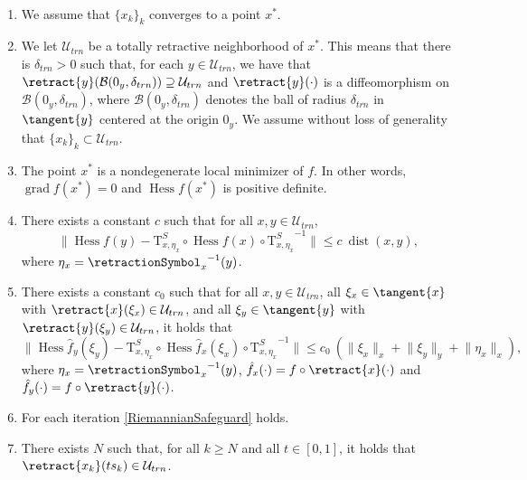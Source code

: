 \begin{assumption}\label{RiemannianAssumptionsLocalConvergence} \ \\[-1.5\baselineskip]
    \begin{enumerate}
        \item We assume that $\{ x_k \}_k$ converges to a point $x^*$.
        \item We let $\mathcal{U}_{trn}$ be a totally retractive neighborhood of $x^*$. This means that there is $\delta_{trn} > 0$ such that, for each $y \in \mathcal{U}_{trn}$, we have that $\retract{y}(\mathcal{B}(0_y, \delta_{trn})) \supseteq \mathcal{U}_{trn}$ and $\retract{y}(\cdot)$ is a diffeomorphism on $\mathcal{B}(0_y, \delta_{trn})$, where $\mathcal{B}(0_y, \delta_{trn})$ denotes the ball of radius $\delta_{trn}$ in $\tangent{y}$ centered at the origin $0_y$. We assume without loss of generality that $\{ x_k \}_k \subset \mathcal{U}_{trn}$.
        \item The point $x^*$ is a nondegenerate local minimizer of $f$. In other words, $\operatorname{grad} f(x^*) = 0$ and $\operatorname{Hess} f(x^*)$ is positive definite.
        \item There exists a constant $c$ such that for all $x, y \in \mathcal{U}_{trn}$, \begin{equation*} \lVert \operatorname{Hess} f(y) - \mathrm{T}^{S}_{x, \eta_x} \circ \operatorname{Hess} f(x) \circ {\mathrm{T}^{S}_{x, \eta_x}}^{-1} \rVert \leq c \ \operatorname{dist}(x,y), \end{equation*} where $\eta_x = {\retractionSymbol_{x}}^{-1}(y)$.
        \item There exists a constant $c_0$ such that for all $x, y \in \mathcal{U}_{trn}$, all $\xi_x \in \tangent{x}$ with $\retract{x}(\xi_x) \in \mathcal{U}_{trn}$, and all $\xi_y \in \tangent{y}$ with $\retract{y}(\xi_y) \in \mathcal{U}_{trn}$, it holds that \begin{equation*} \lVert \operatorname{Hess} \hat{f}_y(\xi_y) - \mathrm{T}^{S}_{x, \eta_x} \circ \operatorname{Hess} \hat{f}_x(\xi_x) \circ {\mathrm{T}^{S}_{x, \eta_x}}^{-1} \rVert \leq c_0 \ (\lVert \xi_x \rVert_x + \lVert \xi_y \rVert_y + \lVert \eta_x \rVert_x), \end{equation*} where $\eta_x = {\retractionSymbol_{x}}^{-1}(y)$, $\hat{f}_x(\cdot) = f \circ \retract{x}(\cdot)$ and $\hat{f}_y(\cdot) = f \circ \retract{y}(\cdot)$.
        \item For each iteration \cref{RiemannianSafeguard} holds.
        \item There exists $N$ such that, for all $k \geq N$ and all $t \in [0, 1]$, it holds that $\retract{x_k}(t s_k) \in \mathcal{U}_{trn}$.
    \end{enumerate}
\end{assumption}

